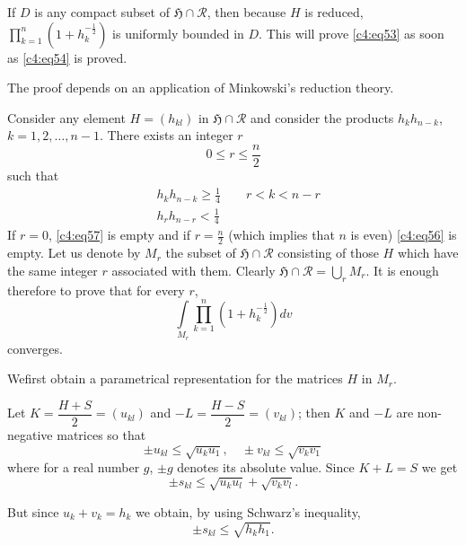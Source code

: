 If $D$ is any compact subset of $\mathfrak{H}\cap\mathscr{R}$, then
because $H$ is reduced,
$\prod\limits^{n}_{k=1}(1+h^{-\frac{1}{2}}_{k})$ is uniformly bounded
in $D$. This will prove \eqref{c4:eq53} as soon as \eqref{c4:eq54} is proved.

The proof depends on an application of Minkowski's reduction theory.

Consider any element $H=(h_{k l})$ in
$\mathfrak{H}\cap \mathscr{R}$ and consider the products
$h_{k}h_{n-k}$, $k=1,2,\ldots,n-1$. There exists an integer $r$
\begin{equation*}
0\leq r\leq \frac{n}{2}\tag{55}\label{c4:eq55}
\end{equation*}
such that
\begin{align*}
& h_{k} h_{n-k}\geq \frac{1}{4}\qquad r<k<n-r\tag{56}\label{c4:eq56}\\
& h_{r}h_{n-r}<\frac{1}{4}\tag{57}\label{c4:eq57}
\end{align*}
If $r=0$, \eqref{c4:eq57} is empty and if $r=\frac{n}{2}$ (which implies
that $n$ is even) \eqref{c4:eq56} is empty. Let us denote by $M_{r}$ the
subset of $\mathfrak{H}\cap \mathscr{R}$ consisting of those $H$ which
have the same integer $r$ associated with them. Clearly
$\mathfrak{H}\cap \mathscr{R}=\bigcup\limits_{r}M_{r}$. It is enough
therefore to prove that for every $r$,
$$
\int\limits_{M_{r}}\prod^{n}_{k=1}(1+h^{-\frac{1}{2}}_{k})dv
$$
converges.

We\pageoriginale first obtain a parametrical representation for the
matrices $H$ in $M_{r}$.

Let $K=\dfrac{H+S}{2}=(u_{kl})$ and $-L=\dfrac{H-S}{2}=(v_{kl})$; then
$K$ and $-L$ are non-negative matrices so that
$$
\pm u_{kl}\leq \sqrt{u_{k}u_{1}},\quad \pm v_{kl}\leq
\sqrt{v_{k}v_{1}}
$$
where for a real number $g$, $\pm g$ denotes its absolute value. Since
$K+L=S$ we get
$$
\pm s_{kl}\leq \sqrt{u_{k}u_{l}}+\sqrt{v_{k}v_{l}}.
$$

But since $u_{k}+v_{k}=h_{k}$ we obtain, by using Schwarz's
inequality,
$$
\pm s_{kl}\leq \sqrt{h_{k}h_{1}}.
$$

